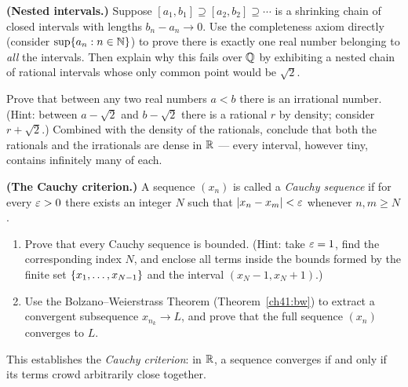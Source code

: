 \begin{exercise}
\label{ch41:ex-nested}
\textbf{(Nested intervals.)} Suppose $[a_1,b_1] \supseteq [a_2,b_2] \supseteq \cdots$ is a
shrinking chain of closed intervals with lengths $b_n - a_n \to 0$. Use the completeness
axiom directly (consider $\sup\{a_n : n\in\mathbb{N}\}$) to prove there is exactly one real number
belonging to \emph{all} the intervals. Then explain why this fails over $\mathbb{Q}$ by exhibiting a
nested chain of rational intervals whose only common point would be $\sqrt2$.
\end{exercise}

\begin{exercise}
\label{ch41:ex-dense}
Prove that between any two real numbers $a < b$ there is an irrational number. (Hint:
between $a-\sqrt2$ and $b-\sqrt2$ there is a rational $r$ by density; consider $r+\sqrt2$.)
Combined with the density of the rationals, conclude that both the rationals and the
irrationals are dense in $\mathbb{R}$ --- every interval, however tiny, contains infinitely many of
each.
\end{exercise}

\begin{exercise}
\label{ch41:ex-cauchy-bounded}
\textbf{(The Cauchy criterion.)} A sequence $(x_n)$ is called a \emph{Cauchy sequence} if for every $\varepsilon > 0$ there exists an integer $N$ such that $\lvert x_n - x_m\rvert < \varepsilon$ whenever $n, m \ge N$.
\begin{enumerate}
  \item Prove that every Cauchy sequence is bounded. (Hint: take $\varepsilon = 1$, find the corresponding index $N$, and enclose all terms inside the bounds formed by the finite set $\{x_1, \ldots, x_{N-1}\}$ and the interval $(x_N - 1, x_N + 1)$.)
  \item Use the Bolzano--Weierstrass Theorem (Theorem~\ref{ch41:bw}) to extract a convergent subsequence $x_{n_k} \to L$, and prove that the full sequence $(x_n)$ converges to $L$.
\end{enumerate}
This establishes the \emph{Cauchy criterion}: in $\mathbb{R}$, a sequence converges if and only if its terms crowd arbitrarily close together.
\end{exercise}
